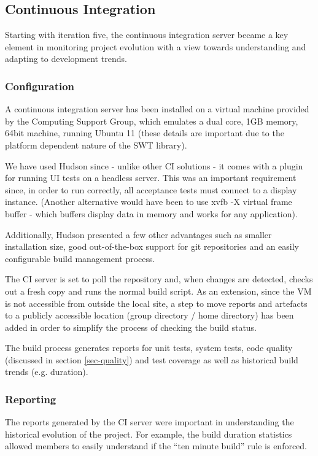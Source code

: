 \documentclass[10pt]{article}
\begin{document}
\subsection{Continuous Integration}

Starting with iteration five, the continuous integration server became a key element in monitoring project evolution with a view towards understanding and adapting to development trends.

\subsubsection{Configuration}
A continuous integration server has been installed on a virtual machine provided by the Computing Support Group, which emulates a dual core, 1GB memory, 64bit machine, running Ubuntu 11 (these details are important due to the platform dependent nature of the SWT library).

We have used Hudson since - unlike other CI solutions - it comes with a plugin for running UI tests on a headless server. This was an important requirement since, in order to run correctly, all acceptance tests must connect to a display instance. (Another alternative would have been to use xvfb -X virtual frame buffer - which buffers display data in memory and works for any application).

Additionally, Hudson presented a few other advantages such as smaller installation size, good out-of-the-box support for git repositories and an easily configurable build management process.

The CI server is set to poll the repository and, when changes are detected, checks out a fresh copy and runs the normal build script. As an extension, since the VM is not accessible from outside the local site, a step to move reports and artefacts to a publicly accessible location (group directory / home directory) has been added in order to simplify the process of checking the build status.

The build process generates reports for unit tests, system tests, code quality (discussed in section \ref{sec-quality}) and test coverage as well as historical build trends (e.g. duration).

\subsubsection{Reporting}
The reports generated by the CI server were important in understanding the historical evolution of the project. For example, the build duration statistics allowed members to easily understand if the ``ten minute build'' rule is enforced.
\end{document}
